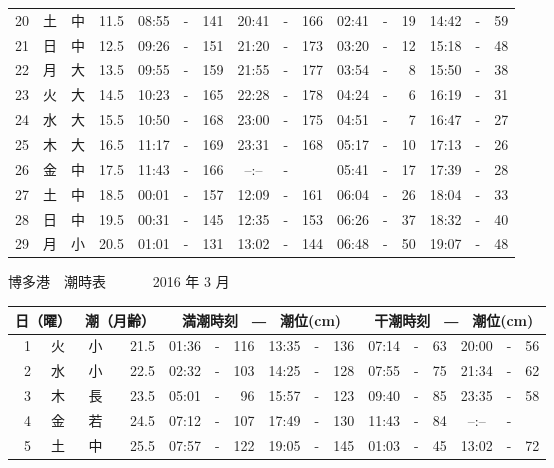 \documentclass[12pt.a4j]{jsarticle}
\begin{document}
\begin{center}
\begin{table}[ht]
\begin{tabular}{|rc|cr|ccrccr|ccrccr|}
20 & 土 & 中 & 11.5 &  08:55 &-& 141  &  20:41 &-& 166  &   02:41 &-&  19  &   14:42 &-&  59  \\
21 & 日 & 中 & 12.5 &  09:26 &-& 151  &  21:20 &-& 173  &   03:20 &-&  12  &   15:18 &-&  48  \\
22 & 月 & 大 & 13.5 &  09:55 &-& 159  &  21:55 &-& 177  &   03:54 &-&   8  &   15:50 &-&  38  \\
23 & 火 & 大 & 14.5 &  10:23 &-& 165  &  22:28 &-& 178  &   04:24 &-&   6  &   16:19 &-&  31  \\
24 & 水 & 大 & 15.5 &  10:50 &-& 168  &  23:00 &-& 175  &   04:51 &-&   7  &   16:47 &-&  27  \\
25 & 木 & 大 & 16.5 &  11:17 &-& 169  &  23:31 &-& 168  &   05:17 &-&  10  &   17:13 &-&  26  \\
26 & 金 & 中 & 17.5 &  11:43 &-& 166  &  --:-- &-&     &   05:41 &-&  17  &   17:39 &-&  28  \\
27 & 土 & 中 & 18.5 &  00:01 &-& 157  &  12:09 &-& 161  &   06:04 &-&  26  &   18:04 &-&  33  \\
28 & 日 & 中 & 19.5 &  00:31 &-& 145  &  12:35 &-& 153  &   06:26 &-&  37  &   18:32 &-&  40  \\
29 & 月 & 小 & 20.5 &  01:01 &-& 131  &  13:02 &-& 144  &   06:48 &-&  50  &   19:07 &-&  48  \\
   \hline
   \end{tabular}
\end{table}
\newpage
 {\LARGE 博多港　潮時表　　　}
 {\large 2016 年  3 月}\\
 \begin{table}[ht]
    \begin{tabular}{|rc|cr|ccrccr|ccrccr|}
    \hline
    \multicolumn{2}{|c|}{日（曜）} & \multicolumn{2}{c|}{潮（月齢）} & \multicolumn{6}{c|}{満潮時刻　―　潮位(cm)} & \multicolumn{6}{c|}{干潮時刻　―　潮位(cm)} \\
 \hline
 1 & 火 & 小 & 21.5 &  01:36 &-& 116  &  13:35 &-& 136  &   07:14 &-&  63  &   20:00 &-&  56  \\
 2 & 水 & 小 & 22.5 &  02:32 &-& 103  &  14:25 &-& 128  &   07:55 &-&  75  &   21:34 &-&  62  \\
 3 & 木 & 長 & 23.5 &  05:01 &-&  96  &  15:57 &-& 123  &   09:40 &-&  85  &   23:35 &-&  58  \\
 4 & 金 & 若 & 24.5 &  07:12 &-& 107  &  17:49 &-& 130  &   11:43 &-&  84  &   --:-- &-&     \\
 5 & 土 & 中 & 25.5 &  07:57 &-& 122  &  19:05 &-& 145  &   01:03 &-&  45  &   13:02 &-&  72  \\

\end{tabular}
\end{table}
\end{center}
\end{document}
